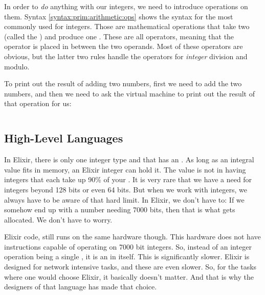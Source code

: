 In order to \textsl{do} anything with our integers, we need to introduce operations on them. Syntax \ref{syntax:prim:arithmetic:ops} shows the syntax for the most commonly used  for integers. Those are mathematical operations that take two  (called the ) and produce one . These are all  operators, meaning that the operator is placed in between the two operands. Most of these operators are obvious, but the latter two rules handle the operators for \textsl{integer} division and modulo.

\begin{syntaxfloat}
  
  \caption{Expressions of arithmetic operators.}
  \label{syntax:prim:arithmetic:ops}
\end{syntaxfloat}

To print out the result of adding two numbers, first we need to add the two numbers, and then we need to ask the virtual machine to print out the result of that operation for us:

\inputminted[]{csharp}{../src/csharp/primitives/int_op/Program.cs}

\subsection{High-Level Languages}

In Elixir, there is only one integer type and that has an . As long as an integral value fits in memory, an Elixir integer can hold it. The value is not in having integers that each take up 90\% of your . It is very rare that we have a need for integers beyond 128 bits or even 64 bits. But when we work with  integers, we always have to be aware of that hard limit. In Elixir, we don't have to: If we somehow end up with a number needing 7000 bits, then that is what gets allocated. We don't have to worry.

Elixir code, still runs on the same hardware though. This hardware does not have instructions capable of operating on 7000 bit integers. So, instead of an integer operation being a single , it is an  in itself. This is significantly slower. Elixir is designed for network intensive tasks, and these are even slower. So, for the tasks where one would choose Elixir, it basically doesn't matter. And that is why the designers of that language has made that choice.

